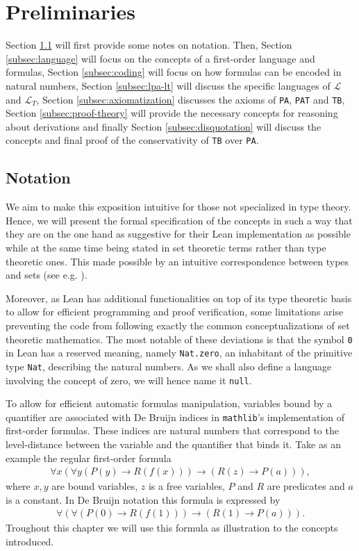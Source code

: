\chapter{Preliminaries}
Section \ref{subsec:notation} will first provide some notes on notation. Then, Section \ref{subsec:language} will focus on the concepts of a first-order language and formulas, Section \ref{subsec:coding} will focus on how formulas can be encoded in natural numbers, Section \ref{subsec:lpa-lt} will discuss the specific languages of $\mathcal{L}$ and $\mathcal{L}_T$, Section \ref{subsec:axiomatization} discusses the axioms of \texttt{PA}, \texttt{PAT} and \texttt{TB}, Section \ref{subsec:proof-theory} will provide the necessary concepts for reasoning about derivations and finally Section \ref{subsec:disquotation} will discuss the concepts and final proof of the conservativity of \texttt{TB} over \texttt{PA}.

\section{Notation}\label{subsec:notation}
We aim to make this exposition intuitive for those not specialized in type theory. Hence, we will present the formal specification of the concepts in such a way that they are on the one hand as suggestive for their Lean implementation as possible while at the same time being stated in set theoretic terms rather than type theoretic ones. This made possible by an intuitive correspondence between types and sets (see e.g. \cite{nederpelt:1994}).

Moreover, as Lean has additional functionalities on top of its type theoretic basis to allow for efficient programming and proof verification, some limitations arise preventing the code from following exactly the common conceptualizations of set theoretic mathematics. The most notable of these deviations is that the symbol \lstinline $0$ in Lean has a reserved meaning, namely \lstinline $Nat.zero$, an inhabitant of the primitive type \lstinline $Nat$, describing the natural numbers. As we shall also define a language involving the concept of zero, we will hence name it \lstinline $null$.

To allow for efficient automatic formulas manipulation, variables bound by a quantifier are associated with De Bruijn \cite{bruijn:1972} indices in \texttt{mathlib}'s implementation of first-order formulas. These indices are natural numbers that correspond to the level-distance between the variable and the quantifier that binds it. Take as an example the regular first-order formula 
\begin{align}
    \forall x (\forall y (P(y) \to R(f(x))) \to (R(z) \to P(a))),
\end{align} where $x, y$ are bound variables, $z$ is a free variables, $P$ and $R$ are predicates and $a$ is a constant.
In De Bruijn notation this formula is expressed by
\begin{align}\label{fml:db}
    \forall (\forall (P(0) \to R(f(1))) \to (R(1) \to P(a))).
\end{align}
Troughout this chapter we will use this formula as illustration to the concepts introduced.

